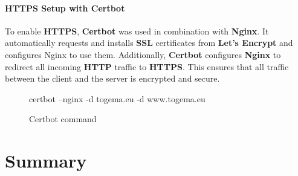 \documentclass[a4paper,12pt]{report}
\begin{document}
\subsubsection{HTTPS Setup with Certbot}
To enable \textbf{HTTPS}, \textbf{Certbot} was used in combination with \textbf{Nginx}. It automatically requests and installs \textbf{SSL} certificates from \textbf{Let’s Encrypt} and configures Nginx to use them. Additionally, \textbf{Certbot} configures \textbf{Nginx} to redirect all incoming \textbf{HTTP} traffic to \textbf{HTTPS}. This ensures that all traffic between the client and the server is encrypted and secure.
\begin{figure}[H]
	\begin{terminal}
		certbot --nginx -d togema.eu -d www.togema.eu
	\end{terminal}
	\caption{Certbot command}
\end{figure}

\chapter{Summary}

\printbibliography

\listoffigures
\newpage
\end{document}
